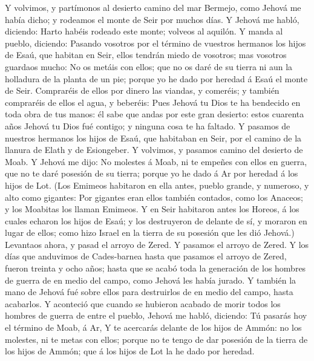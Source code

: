  Y volvimos, y partímonos al desierto camino del mar
Bermejo, como Jehová me había dicho; y rodeamos el monte de Seir por
muchos días.  Y Jehová me habló, diciendo: 
Harto habéis rodeado este monte; volveos al aquilón.  Y
manda al pueblo, diciendo: Pasando vosotros por el término de vuestros
hermanos los hijos de Esaú, que habitan en Seir, ellos tendrán miedo de
vosotros; mas vosotros guardaos mucho:  No os metáis con
ellos; que no os daré de su tierra ni aun la holladura de la planta de
un pie; porque yo he dado por heredad á Esaú el monte de Seir.
 Compraréis de ellos por dinero las viandas, y comeréis; y
también compraréis de ellos el agua, y beberéis:  Pues
Jehová tu Dios te ha bendecido en toda obra de tus manos: él sabe que
andas por este gran desierto: estos cuarenta años Jehová tu Dios fué
contigo; y ninguna cosa te ha faltado.  Y pasamos de
nuestros hermanos los hijos de Esaú, que habitaban en Seir, por el
camino de la llanura de Elath y de Esiongeber. Y volvimos, y pasamos
camino del desierto de Moab.  Y Jehová me dijo: No
molestes á Moab, ni te empeñes con ellos en guerra, que no te daré
posesión de su tierra; porque yo he dado á Ar por heredad á los hijos de
Lot.  (Los Emimeos habitaron en ella antes, pueblo
grande, y numeroso, y alto como gigantes:  Por gigantes
eran ellos también contados, como los Anaceos; y los Moabitas los llaman
Emimeos.  Y en Seir habitaron antes los Horeos, á los
cuales echaron los hijos de Esaú; y los destruyeron de delante de sí, y
moraron en lugar de ellos; como hizo Israel en la tierra de su posesión
que les dió Jehová.)  Levantaos ahora, y pasad el arroyo
de Zered. Y pasamos el arroyo de Zered.  Y los días que
anduvimos de Cades-barnea hasta que pasamos el arroyo de Zered, fueron
treinta y ocho años; hasta que se acabó toda la generación de los
hombres de guerra de en medio del campo, como Jehová les había jurado.
 Y también la mano de Jehová fué sobre ellos para
destruirlos de en medio del campo, hasta acabarlos.  Y
aconteció que cuando se hubieron acabado de morir todos los hombres de
guerra de entre el pueblo,  Jehová me habló, diciendo:
 Tú pasarás hoy el término de Moab, á Ar, 
Y te acercarás delante de los hijos de Ammón: no los molestes, ni te
metas con ellos; porque no te tengo de dar posesión de la tierra de los
hijos de Ammón; que á los hijos de Lot la he dado por heredad.
